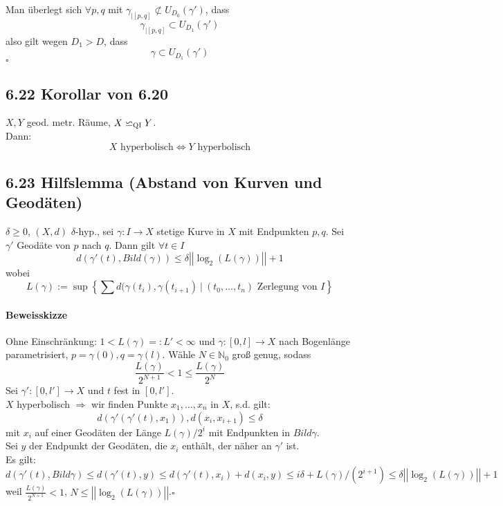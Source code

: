 \documentclass{article}
\newcommand{\N}{\mathbb{N}}
\newcommand{\set}[2]{\left\lbrace #1~|~#2 \right\rbrace}
\newcommand{\qed}{\hfill $\square$}
\newcommand{\qi}{\backsimeq_{\textsc{QI}}}
\newcommand{\norm}[1]{\left|\left|#1\right|\right|}
\begin{document}
Man überlegt sich $\forall p,q$ mit $\gamma_{|[p,q]} \not \subset U_{D_0}(\gamma')$, dass
\[\gamma_{|[p,q]} \subset U_{D_1} (\gamma')\]
also gilt wegen $D_1 > D$, dass
\[\gamma \subset U_{D_1}(\gamma') \]
\qed



\subsection{6.22 Korollar von 6.20}
$X,Y$ geod. metr. Räume, $X \qi Y$.\\
Dann:
\[X \text{ hyperbolisch} \Longleftrightarrow Y \text{ hyperbolisch} \]

\subsection{6.23 Hilfslemma (Abstand von Kurven und Geodäten)}
$\delta \geq 0$, $(X,d)$ $\delta$-hyp., sei $\gamma : I \rightarrow X$ stetige Kurve in $X$ mit Endpunkten $p,q$. Sei $\gamma'$ Geodäte von $p$ nach $q$. Dann gilt $\forall t\in I$
\[d(\gamma'(t), Bild(\gamma)) \leq \delta \norm{\log_2(L(\gamma))} + 1 \]
wobei 
\[L(\gamma) := \sup \set{\sum d(\gamma(t_i), \gamma(t_{i+1})}{(t_0, \ldots, t_n) \text{ Zerlegung von } I} \]

\paragraph{Beweisskizze}
Ohne Einschränkung: $1 < L(\gamma) =: L' < \infty$ und $\gamma: [0,l] \rightarrow X$ nach Bogenlänge parametrisiert, $p = \gamma(0), q = \gamma(l)$. Wähle $N \in \N_0$ groß genug, sodass
\[\frac{L(\gamma)}{2^{N+1}} < 1 \leq \frac{L(\gamma)}{2^N} \]
Sei $\gamma' : [0, l'] \rightarrow X$ und $t$ fest in $[0, l']$.\\
$X$ hyperbolisch $\Longrightarrow$ wir finden Punkte $x_1, \ldots, x_n$ in $X$, s.d. gilt:
\[d(\gamma'(\gamma'(t), x_1) ) , d(x_i, x_{i+1}) \leq \delta \]
mit $x_i$ auf einer Geodäten der Länge $L(\gamma)/2^i$ mit Endpunkten in $Bild \gamma$.\\
Sei $y$ der Endpunkt der Geodäten, die $x_i$ enthält, der näher an $\gamma'$ ist.\\
Es gilt:
\[d(\gamma'(t) , Bild \gamma) \leq d(\gamma'(t), y) \leq d(\gamma'(t), x_i) + d(x_i,y) \leq i \delta + L(\gamma)/(2^{i+1}) \leq \delta \norm{\log_2(L(\gamma))} + 1 \]
weil $\frac{L(\gamma)}{2^{N+1}} < 1$, $N \leq \norm{\log_2(L(\gamma))}$.\qed

\end{document}
